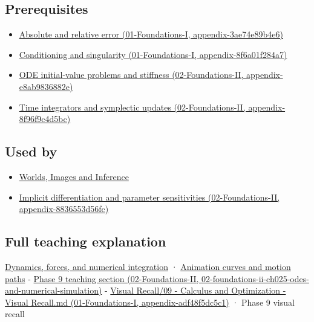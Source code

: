 \subsection{Prerequisites}\label{appendix-18eacf61a04b-prerequisites}

\begin{itemize}
\tightlist
\item
  \href{../01-Foundations-I/main.pdf\#nameddest=appendix-3ae74e89b4e6}{Absolute and relative error (01-Foundations-I, appendix-3ae74e89b4e6)}
\item
  \href{../01-Foundations-I/main.pdf\#nameddest=appendix-8f6a01f284a7}{Conditioning and singularity (01-Foundations-I, appendix-8f6a01f284a7)}
\item
  \href{../02-Foundations-II/main.pdf\#nameddest=appendix-e8ab9836882e}{ODE initial-value problems and stiffness (02-Foundations-II, appendix-e8ab9836882e)}
\item
  \href{../02-Foundations-II/main.pdf\#nameddest=appendix-8f96f9c4d5bc}{Time integrators and symplectic updates (02-Foundations-II, appendix-8f96f9c4d5bc)}
\end{itemize}

\subsection{Used by}\label{appendix-18eacf61a04b-used-by}

\begin{itemize}
\tightlist
\item
  \href{Continuous\%20Notes/University\%20-\%20Worlds,\%20Images\%20and\%20Inference\%20-\%20Graphics,\%20Vision\%20and\%20Photography}{Worlds, Images and Inference}
\item
  \href{../02-Foundations-II/main.pdf\#nameddest=appendix-8836553d56fc}{Implicit differentiation and parameter sensitivities (02-Foundations-II, appendix-8836553d56fc)}
\end{itemize}

\subsection{Full teaching explanation}\label{appendix-18eacf61a04b-full-teaching-explanation}

\hyperref[04-visual-computing-ii-ch029-dynamics-forces-and-numerical-integration]{Dynamics, forces, and numerical integration} · \hyperref[04-visual-computing-ii-ch029-animation-curves-and-motion-paths]{Animation curves and motion paths} - \href{../02-Foundations-II/main.pdf\#nameddest=02-foundations-ii-ch025-odes-and-numerical-simulation}{Phase 9 teaching section (02-Foundations-II, 02-foundations-ii-ch025-odes-and-numerical-simulation)} - \href{../01-Foundations-I/main.pdf\#nameddest=appendix-adf48f5dc5c1}{Visual Recall/09 - Calculus and Optimization - Visual Recall.md (01-Foundations-I, appendix-adf48f5dc5c1)} · Phase 9 visual recall
